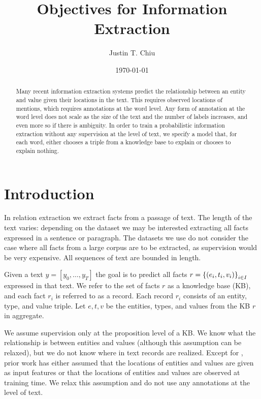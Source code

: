 \documentclass[12pt]{article}
\title{Objectives for Information Extraction}
\author{
Justin T. Chiu
}
\date{\today}
\begin{document}
\maketitle

\begin{abstract}
Many recent information extraction systems predict the relationship between an entity and value given
their locations in the text.
This requires observed locations of mentions, which requires annotations at the word level.
Any form of annotation at the word level does not scale as the size of the text
and the number of labels increases, and even more so if there is ambiguity.
In order to train a probabilistic information extraction without any
supervision at the level of text, we specify a model 
that, for each word, either chooses a triple from a knowledge base to explain
or chooses to explain nothing.
\end{abstract}

\section{Introduction}

In relation extraction we extract facts from a passage of text.
The length of the text varies: depending on the dataset we may be interested extracting
all facts expressed in a sentence or paragraph.
The datasets we use do not consider the case where all facts from a large corpus are to be extracted,
as supervision would be very expensive.
All sequences of text are bounded in length.

Given a text $y = [y_0, \ldots, y_T]$ the goal is to predict all facts
$r = \left\{(e_i, t_i, v_i)\right\}_{i \in I}$ expressed in that text.
We refer to the set of facts $r$ as a knowledge base (KB),
and each fact $r_i$ is referred to as a record.
Each record $r_i$ consists of an entity, type, and value triple. 
Let $e,t,v$ be the entities, types, and values from the KB $r$ in aggregate.

We assume supervision only at the proposition level of a KB.
We know what the relationship is between entities and values
(although this assumption can be relaxed),
but we do not know where in text records are realized.
Except for \citet{zeng2018copy}, prior work has either assumed that the locations of
entities and values are given as input features or that the locations of entities and values
are observed at training time.
We relax this assumption and do not use any annotations at the level of text.
\end{document}
